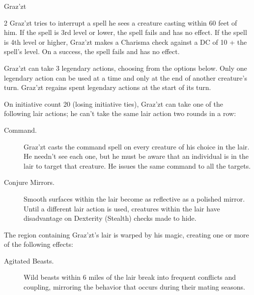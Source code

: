 \documentclass[10pt,a4paper,twoside,bg=print,twocolumn,openany,nodeprecatedcode]{dndbook}
\begin{document}
\begin{DndMonster}[float*=b,width=\textwidth + 8pt]{Graz'zt}
\begin{multicols}{2}
Graz'zt tries to interrupt a spell he sees a creature casting within 60 feet of him. If the spell is 3rd level or lower, the spell fails and has no effect. If the spell is 4th level or higher, Graz'zt makes a Charisma check against a DC of 10 + the spell's level. On a success, the spell fails and has no effect.

Graz'zt can take 3 legendary actions, choosing from the options below. Only one legendary action can be used at a time and only at the end of another creature's turn. Graz'zt regains spent legendary actions at the start of its turn.

\begin{DndMonsterLegendaryActions}
\end{DndMonsterLegendaryActions}
On initiative count 20 (losing initiative ties), Graz'zt can take one of the following lair actions; he can't take the same lair action two rounds in a row:


\begin{description}
\item[Command.]
Graz'zt casts the command spell on every creature of his choice in the lair. He needn't see each one, but he must be aware that an individual is in the lair to target that creature. He issues the same command to all the targets.

\item[Conjure Mirrors.]
Smooth surfaces within the lair become as reflective as a polished mirror. Until a different lair action is used, creatures within the lair have disadvantage on Dexterity (Stealth) checks made to hide.

\end{description}

The region containing Graz'zt's lair is warped by his magic, creating one or more of the following effects:


\begin{description}
\item[Agitated Beasts.]
Wild beasts within 6 miles of the lair break into frequent conflicts and coupling, mirroring the behavior that occurs during their mating seasons.


\end{description}
\end{multicols}
\end{DndMonster}
\end{document}
